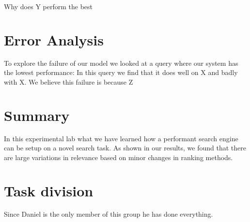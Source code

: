 \documentclass[11pt]{article}
\begin{document}
Why does Y perform the best
\section{Error Analysis}
To explore the failure of our model we looked at a query where our system has the lowest performance:{} 
In this query we find that it does well on X and badly with X. We believe this failure is because Z
\section{Summary}
In this experimental lab what we have learned how a performant search engine can be setup on a novel search task. As shown in our results, we found that there are large variations in relevance based on minor changes in ranking methods.  
\section{Task division}
Since Daniel is the only member of this group he has done everything. 
\end{document}
